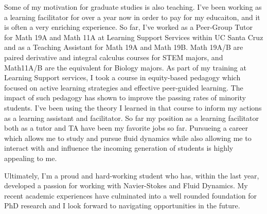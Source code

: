 \documentclass{article}
\begin{document}
Some of my motivation for graduate studies is also teaching. I've been working as a learning facilitator for over a year now in order to pay for my educaiton, and it is often a very enriching experience. So far, I've worked as a Peer-Group Tutor for Math 19A and Math 11A at Learning Support Services within UC Santa Cruz and as a Teaching Assistant for Math 19A and Math 19B. Math 19A/B are paired derivative and integral calculus courses for STEM majors, and Math11A/B are the equivalent for Biology majors. As part of my training at Learning Support services, I took a course in equity-based pedagogy which focused on active learning strategies and effective peer-guided learning. The impact of such pedagogy has shown to improve the passing rates of minority students. I've been using the theory I learned in that course to inform my actions as a learning assistant and facilitator. So far my position as a learning facilitator both as a tutor and TA have been my favorite jobs so far. Pursueing a career which allows me to study and pursue fluid dynamics while also allowing me to interact with and influence the incoming generation of students is highly appealing to me. 

Ultimately, I'm a proud and hard-working student who has, within the last year, developed a passion for working with Navier-Stokes and Fluid Dynamics. My recent academic experiences have culminated into a well rounded foundation for PhD research and I look forward to navigating opportunities in the future. 

\end{document}
